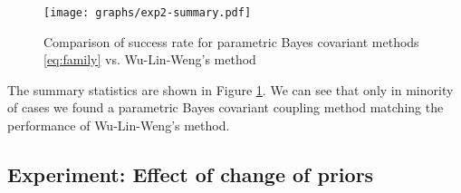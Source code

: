 \begin{figure}[!ht]
\texttt{[image: graphs/exp2-summary.pdf]}
\caption{Comparison of success rate for parametric Bayes covariant methods \eqref{eq:family} vs. Wu-Lin-Weng's method}
\label{fig:par-bc}
\end{figure}

The summary statistics are shown in Figure \ref{fig:par-bc}.
We can see that only in minority of cases we found a parametric Bayes covariant coupling method matching the performance of Wu-Lin-Weng's method. 

%
%
%
%
%
%
%
%

\subsection{Experiment: Effect of change of priors}  \label{sec:exp4}

